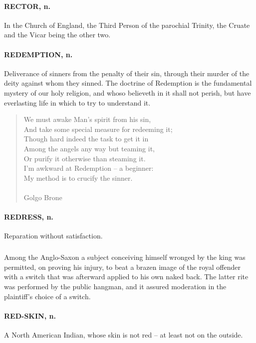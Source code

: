 \documentclass[11pt]{article}
\begin{document}
\paragraph{RECTOR, n.}  In the Church of England, the Third Person of the
parochial Trinity, the Cruate and the Vicar being the other two.

\paragraph{REDEMPTION, n.}  Deliverance of sinners from the penalty of their sin,
through their murder of the deity against whom they sinned.  The
doctrine of Redemption is the fundamental mystery of our holy
religion, and whoso believeth in it shall not perish, but have
everlasting life in which to try to understand it.

\begin{quote}   We must awake Man's spirit from his sin, \\
      And take some special measure for redeeming it; \\
  Though hard indeed the task to get it in \\
      Among the angels any way but teaming it, \\
      Or purify it otherwise than steaming it. \\
  I'm awkward at Redemption -- a beginner: \\
  My method is to crucify the sinner. \\
 \\
Golgo Brone \end{quote}


\paragraph{REDRESS, n.}  Reparation without satisfaction.
\subparagraph{}   Among the Anglo-Saxon a subject conceiving himself wronged by the
king was permitted, on proving his injury, to beat a brazen image of
the royal offender with a switch that was afterward applied to his own
naked back.  The latter rite was performed by the public hangman, and
it assured moderation in the plaintiff's choice of a switch.

\paragraph{RED-SKIN, n.}  A North American Indian, whose skin is not red -- at
least not on the outside.
\end{document}
